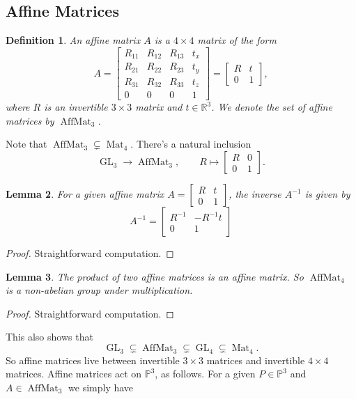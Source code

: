 \documentclass{article}
\newtheorem{definition}{Definition}
\newtheorem{lemma}[definition]{Lemma}
\DeclareMathOperator{\AffMat}{AffMat}
\DeclareMathOperator{\Mat}{Mat}
\DeclareMathOperator{\GL}{GL}
\begin{document}
\subsection{Affine Matrices}

\begin{definition}
An \emph{affine matrix} $A$ is a $4 \times 4$ matrix of the form
\[ A = \begin{bmatrix}
	R_{11} & R_{12} & R_{13} & t_{x} \\
	R_{21} & R_{22} & R_{23} & t_{y} \\
	R_{31} & R_{32} & R_{33} & t_{z} \\
	0      &      0 &      0 & 1 \end{bmatrix} = \begin{bmatrix} R & t \\ 0 & 1 \end{bmatrix}, \]
where $R$ is an invertible $3 \times 3$ matrix and $t \in \mathbb{R}^3$. We denote the set of affine matrices by $\AffMat_3$.
\end{definition}
Note that $\AffMat_3 \subsetneq \Mat_4$. There's a natural inclusion
\[ \GL_3 \to \AffMat_3 , \qquad R \mapsto \begin{bmatrix} R & 0 \\ 0 & 1 \end{bmatrix}. \]

\begin{lemma}
For a given affine matrix $A = \begin{bmatrix} R & t \\ 0 & 1 \end{bmatrix}$, the inverse $A^{-1}$ is given by
\[ A^{-1} = \begin{bmatrix} R^{-1} & -R^{-1}t \\ 0 & 1 \end{bmatrix} \]
\end{lemma}
\begin{proof}
Straightforward computation.
\end{proof}
\begin{lemma}
The product of two affine matrices is an affine matrix. So $\AffMat_4$ is a non-abelian group under multiplication.
\end{lemma}
\begin{proof}
Straightforward computation.
\end{proof}
This also shows that
\[ \GL_3 \subsetneq \AffMat_3 \subsetneq \GL_4 \subsetneq \Mat_4. \]
So affine matrices live between invertible $3 \times 3$ matrices and invertible $4 \times 4$ matrices. Affine matrices act on $\mathbb{P}^3$, as follows. For a given $P \in \mathbb{P}^3$ and $A \in \AffMat_3$ we simply have
\end{document}
